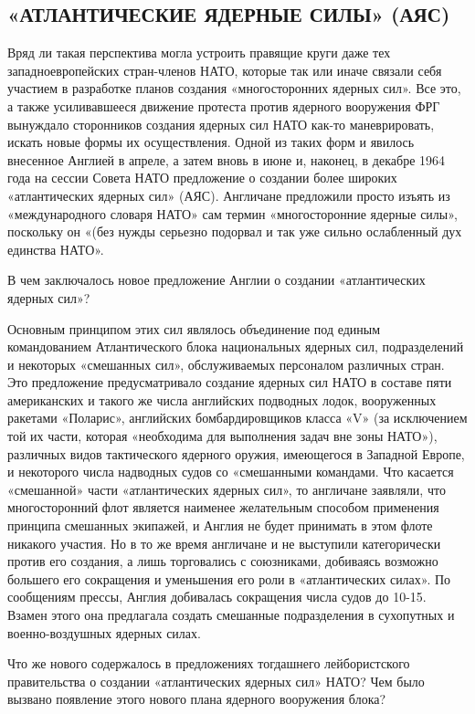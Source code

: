 \documentclass[12pt, a4paper, openany]{book}
\begin{document}
		\subsection[«Атлантические ядерные силы» (АЯС)]{\center «АТЛАНТИЧЕСКИЕ ЯДЕРНЫЕ СИЛЫ» (АЯС)}	
		
		
		Вряд ли такая перспектива могла устроить правящие круги даже тех западноевропейских стран-членов НАТО, которые так или иначе связали себя участием в разработке планов создания «многосторонних ядерных сил». Все это, а также усиливавшееся движение протеста против ядерного вооружения ФРГ вынуждало сторонников создания ядерных сил НАТО как-то маневрировать, искать новые формы их осуществления. Одной из таких форм и явилось внесенное Англией в апреле, а затем вновь в июне и, наконец, в декабре 1964 года на сессии Совета НАТО предложение о создании более широких «атлантических ядерных сил» (АЯС). Англичане предложили просто изъять из «международного словаря НАТО» сам термин «многосторонние ядерные силы», поскольку он «(без нужды серьезно подорвал и так уже сильно ослабленный дух единства НАТО».
		
		В чем заключалось новое предложение Англии о создании «атлантических ядерных сил»?
		
		Основным принципом этих сил являлось объединение под единым командованием Атлантического блока национальных ядерных сил, подразделений и некоторых «смешанных сил», обслуживаемых персоналом различных стран. Это предложение предусматривало создание ядерных сил НАТО в составе пяти американских и такого же числа английских подводных лодок, вооруженных ракетами «Поларис», английских бомбардировщиков класса «V» (за исключением той их части, которая «необходима для выполнения задач вне зоны НАТО»), различных видов тактического ядерного оружия, имеющегося в Западной Европе, и некоторого числа надводных судов со «смешанными командами. Что касается «смешанной» части «атлантических ядерных сил», то англичане заявляли, что многосторонний флот является наименее желательным способом применения принципа смешанных экипажей, и Англия не будет принимать в этом флоте никакого участия. Но в то же время англичане и не выступили категорически против его создания, а лишь торговались с союзниками, добиваясь возможно большего его сокращения и уменьшения его роли в «атлантических силах». По сообщениям прессы, Англия добивалась сокращения числа судов до 10-15. Взамен этого она предлагала создать смешанные подразделения в сухопутных и военно-воздушных ядерных силах.
		
		Что же нового содержалось в предложениях тогдашнего лейбористского правительства о создании «атлантических ядерных сил» НАТО? Чем было вызвано появление этого нового плана ядерного вооружения блока?
		
\end{document}
